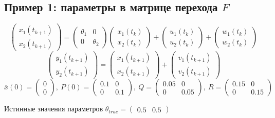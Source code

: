 \documentclass[a4paper,14pt]{extarticle}
\newcommand{\fut}[0]{t_{k+1}}
\begin{document}
\subsection{Пример 1: параметры в матрице перехода $F$}
\[
  \begin{pmatrix} x_1(\fut) \\ x_2(\fut) \end{pmatrix} =
  \begin{pmatrix} \theta_1 & 0 \\ 0 & \theta_2 \end{pmatrix}
  \begin{pmatrix} x_1(t_k) \\ x_2(t_k) \end{pmatrix}
  + \begin{pmatrix} u_1(t_k) \\ u_2(t_k) \end{pmatrix}
  + \begin{pmatrix} w_1(t_k) \\ w_2(t_k) \end{pmatrix}
\]
\[
  \begin{pmatrix} y_1(\fut) \\ y_2(\fut) \end{pmatrix} =
  \begin{pmatrix} x_1(\fut) \\ x_2(\fut) \end{pmatrix} +
  \begin{pmatrix} v_1(\fut) \\ v_2(\fut) \end{pmatrix}
\]
\[
  \overline{x}(0) = \begin{pmatrix} 0 \\ 0 \end{pmatrix},\
  P(0) = \begin{pmatrix} 0.1 & 0 \\ 0 & 0.1 \end{pmatrix},\
  Q = \begin{pmatrix} 0.05 & 0 \\ 0 & 0.05 \end{pmatrix},\
  R = \begin{pmatrix} 0.15 & 0 \\ 0 & 0.15 \end{pmatrix}
\]

Истинные значения параметров
$\theta_{true} = \begin{pmatrix} 0.5 & 0.5 \end{pmatrix}$ \\
\end{document}

